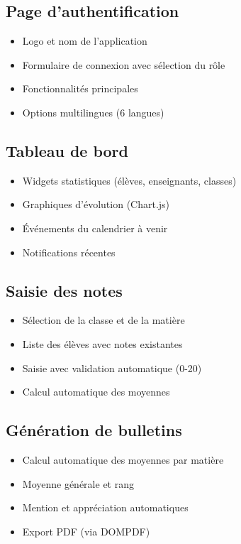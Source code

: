 \documentclass[12pt,a4paper,twoside]{report}
\begin{document}
\subsection{Page d'authentification}
\begin{itemize}
    \item Logo et nom de l'application
    \item Formulaire de connexion avec sélection du rôle
    \item Fonctionnalités principales
    \item Options multilingues (6 langues)
\end{itemize}

\subsection{Tableau de bord}
\begin{itemize}
    \item Widgets statistiques (élèves, enseignants, classes)
    \item Graphiques d'évolution (Chart.js)
    \item Événements du calendrier à venir
    \item Notifications récentes
\end{itemize}

\subsection{Saisie des notes}
\begin{itemize}
    \item Sélection de la classe et de la matière
    \item Liste des élèves avec notes existantes
    \item Saisie avec validation automatique (0-20)
    \item Calcul automatique des moyennes
\end{itemize}

\subsection{Génération de bulletins}
\begin{itemize}
    \item Calcul automatique des moyennes par matière
    \item Moyenne générale et rang
    \item Mention et appréciation automatiques
    \item Export PDF (via DOMPDF)
\end{itemize}
\end{document}

